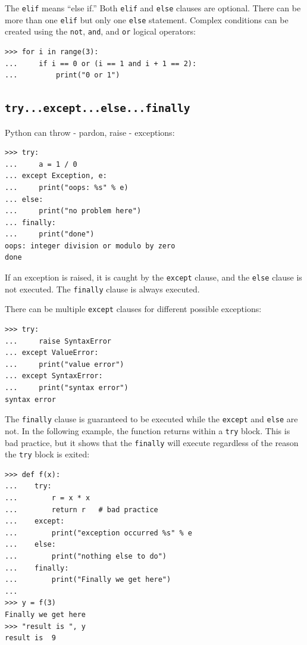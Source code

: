 \documentclass[justified, sixbynine]{tufte-book}
\def\ft{\small\tt}
\theoremstyle{plain}%
\newtheorem * {corollary}{Corollary}
\theoremstyle{definition}
\theoremstyle{remark}
\newtheorem * {remark}{Remark}
\newtheorem * {note}{Note}
\begin{document}
\begin{fullwidth}
The {\ft elif} means ``else if.'' Both {\ft elif} and {\ft else} clauses are optional. There can be more than one {\ft elif} but only one {\ft else} statement. Complex conditions can be created using the {\ft not}, {\ft and}, and {\ft or} logical operators:
\begin{lstlisting}
>>> for i in range(3):
...     if i == 0 or (i == 1 and i + 1 == 2):
...         print("0 or 1")
\end{lstlisting}

\goodbreak\subsection{{\ft try...except...else...finally}}

   
Python can throw - pardon, raise - exceptions:
\begin{lstlisting}
>>> try:
...     a = 1 / 0
... except Exception, e:
...     print("oops: %s" % e)
... else:
...     print("no problem here")
... finally:
...     print("done")
oops: integer division or modulo by zero
done
\end{lstlisting}

If an exception is raised, it is caught by the {\ft except} clause, and the {\ft else} clause is not executed.
The {\ft finally} clause is always executed.

There can be multiple {\ft except} clauses for different possible exceptions:
\begin{lstlisting}
>>> try:
...     raise SyntaxError
... except ValueError:
...     print("value error")
... except SyntaxError:
...     print("syntax error")
syntax error
\end{lstlisting}

The {\ft finally} clause is guaranteed to be executed while the {\ft except} and {\ft else} are not.  In the following example, the function returns within a {\ft try} block.  This is bad practice, but it shows that the {\ft finally} will execute regardless of the reason the {\ft try} block is exited:
\begin{lstlisting}
>>> def f(x):
...    try:
...        r = x * x
...        return r   # bad practice
...    except:
...        print("exception occurred %s" % e
...    else:
...        print("nothing else to do")
...    finally:
...        print("Finally we get here")
...
>>> y = f(3)
Finally we get here
>>> "result is ", y
result is  9
\end{lstlisting}


\end{fullwidth}
\end{document}
